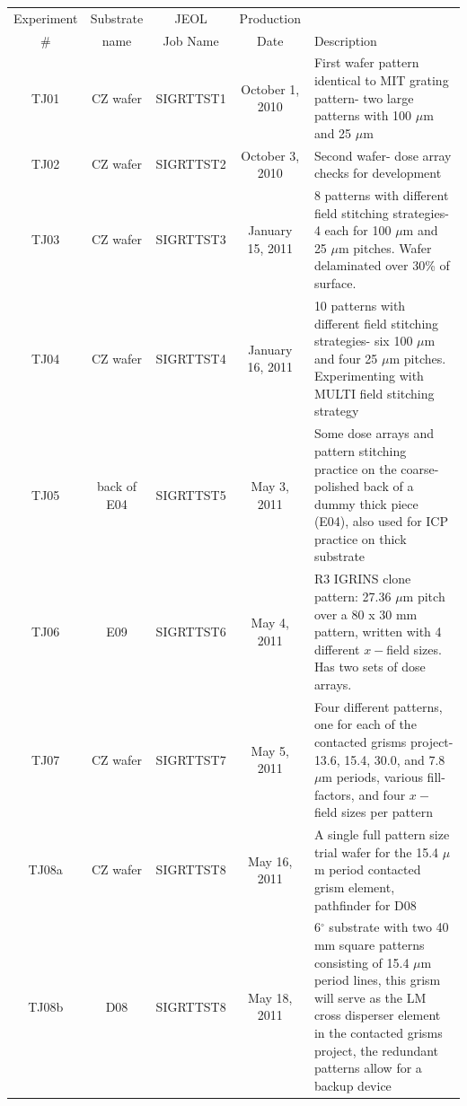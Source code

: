 \documentclass[]{spie}  %
\begin{document}
\begin{landscape}
\begin{longtable}{ccccp{8cm}}
	\hline
	 Experiment  &  Substrate  & JEOL  & Production  &  \\
	  \# &   name & Job Name &  Date & Description \\
	\hline
	TJ01 & CZ wafer & SIGRTTST1 & October 1, 2010 & First wafer pattern identical to MIT grating pattern- two large patterns with 100 $\mu$m and 25 $\mu$m\\
	\cline{5-5}
	TJ02 & CZ wafer & SIGRTTST2 & October 3, 2010 & Second wafer- dose array checks for development \\
	\cline{5-5}
	TJ03 & CZ wafer & SIGRTTST3 & January 15, 2011 & 8 patterns with different field stitching strategies- 4 each for 100 $\mu$m and 25 $\mu$m pitches.  Wafer delaminated over 30\% of surface.\\	
	\cline{5-5}
	TJ04 & CZ wafer & SIGRTTST4 & January 16, 2011 & 10 patterns with different field stitching strategies- six 100 $\mu$m and four 25 $\mu$m pitches.  Experimenting with MULTI field stitching strategy\\	
	\cline{5-5}
	TJ05 & back of E04 & SIGRTTST5 & May 3, 2011 & Some dose arrays and pattern stitching practice on the coarse-polished back of a dummy thick piece (E04), also used for ICP practice on thick substrate\\	
	\cline{5-5}
	TJ06 & E09 & SIGRTTST6 & May 4, 2011 & R3 IGRINS clone pattern: 27.36 $\mu$m pitch over a 80 x 30 mm pattern, written with 4 different $x-$field sizes.  Has two sets of dose arrays.\\	
	\cline{5-5}
	TJ07 & CZ wafer & SIGRTTST7 & May 5, 2011 & Four different patterns, one for each of the contacted grisms project- 13.6, 15.4, 30.0, and 7.8 $\mu$m periods, various fill-factors, and four $x-$field sizes per pattern\\		
	\cline{5-5}
	TJ08a & CZ wafer & SIGRTTST8 & May 16, 2011 & A single full pattern size trial wafer for the 15.4 $\mu$m period contacted grism element, pathfinder for D08\\
	\cline{5-5}
	TJ08b & D08 & SIGRTTST8 & May 18, 2011 & 6$^{\circ}$ substrate with two 40 mm square patterns consisting of 15.4 $\mu$m period lines, this grism will serve as the LM cross disperser element in the contacted grisms project, the redundant patterns allow for a backup device\\	

\end{longtable}
\end{landscape}
\end{document}
